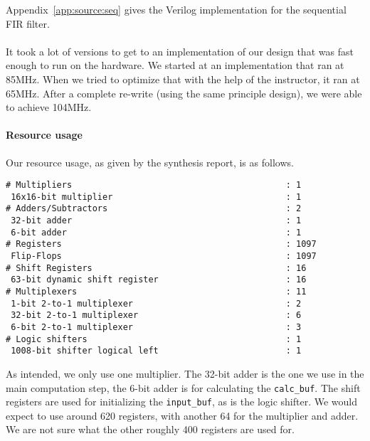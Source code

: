 
\seqfilter
Appendix~\ref{app:source:seq} gives the Verilog implementation for the sequential FIR filter.

\paragraph{}
It took a lot of versions to get to an implementation of our design that was fast enough to run on the hardware.
We started at an implementation that ran at 85MHz.
When we tried to optimize that with the help of the instructor, it ran at 65MHz.
After a complete re-write (using the same principle design), we were able to achieve 104MHz.

\paragraph{Resource usage}
Our resource usage, as given by the synthesis report, is as follows.

\begin{verbatim}
# Multipliers                                          : 1
 16x16-bit multiplier                                  : 1
# Adders/Subtractors                                   : 2
 32-bit adder                                          : 1
 6-bit adder                                           : 1
# Registers                                            : 1097
 Flip-Flops                                            : 1097
# Shift Registers                                      : 16
 63-bit dynamic shift register                         : 16
# Multiplexers                                         : 11
 1-bit 2-to-1 multiplexer                              : 2
 32-bit 2-to-1 multiplexer                             : 6
 6-bit 2-to-1 multiplexer                              : 3
# Logic shifters                                       : 1
 1008-bit shifter logical left                         : 1
\end{verbatim}

As intended, we only use one multiplier.
The 32-bit adder is the one we use in the main computation step, the 6-bit adder is for calculating the \texttt{calc\_buf}.
The shift registers are used for initializing the \texttt{input\_buf}, as is the logic shifter.
We would expect to use around 620 registers, with another 64 for the multiplier and adder.
We are not sure what the other roughly 400 registers are used for.

